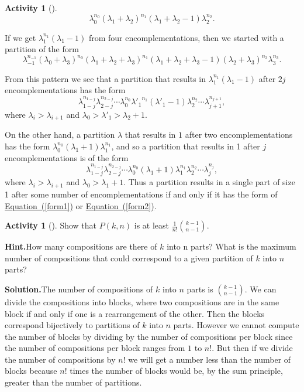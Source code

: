 \documentclass[10pt,]{book}
\theoremstyle{plain}
\theoremstyle{definition}
\newtheorem{activity}[project]{Activity}
\numberwithin{equation}{chapter}
\begin{document}
\begin{activity}[]
\begin{equation*}
\lambda_0^{n_0}(\lambda_1+\lambda_{2})^{n_1}(\lambda_1+
\lambda_2-1)\lambda_2^{n_2}.
\end{equation*}
%
\par
If we get \(\lambda_1^{n_1}(\lambda_1-1)\) from four encomplementations, then we started with a partition of the form%
\begin{equation*}
\lambda_{-1}^{n_{-1}}(\lambda_0+\lambda_{3})^{n_0}(\lambda_1+
\lambda_2 +
\lambda_{3})^{n_1}(\lambda_1+\lambda_2 +\lambda_3-1)(\lambda_2+
\lambda_{3})^{n_3}
\lambda_3^{n_3}.
\end{equation*}
%
\par
From this pattern we see that a partition that results in \(\lambda_1^{n_1}(\lambda_1-1)\) after \(2j\) encomplementations has the form%
\begin{equation}
\lambda_{1-j}^{n_{1-j}}\lambda_{2-j}^{n_{2-j}}\cdots
\lambda_0^{n_0}
{\lambda'_1}^{n_1}
(\lambda'_1-1)\lambda_2^{n_2}\cdots
\lambda_{j+1}^{n_{j+1}},\label{form1}
\end{equation}
where \(\lambda_i>\lambda_{i+1}\) and \(\lambda_0>\lambda'_1>\lambda_2+1\).%
\par
On the other hand, a partition \(\lambda\) that results in \(1\) after two encomplementations has the form \(\lambda_0^{n_0}(\lambda_1+1)\lambda_1^{n_1}\), and so a partition that results in 1 after \(j\) encomplementations is of the form%
\begin{equation}
\lambda_{1-j}^{n_{1-j}}\lambda_{2-j}^{n_{2-j}}\cdots
\lambda_0^{n_0}(\lambda_1+1)\lambda_1^{n_1}\lambda_2^{n_2}\cdots
\lambda_j^{n_j},\label{form2}
\end{equation}
where \(\lambda_i>\lambda_{i+1}\) and \(\lambda_0>\lambda_1+1\). Thus a partition results in a single part of size 1 after some number of encomplementations if and only if it has the form of \hyperref[form1]{Equation~(\ref{form1})} or \hyperref[form2]{Equation~(\ref{form2})}.%
\end{activity}
\begin{activity}[]\label{activity-158}
Show that \(P(k,n)\) is at least \(\frac{1}{n!}\binom{k-1}{n-1}\).%
\par\medskip\noindent%
\textbf{Hint.}\quad How many compositions are there of \(k\) into n parts? What is the maximum number of compositions that could correspond to a given partition of \(k\) into \(n\) parts?%
\par\medskip\noindent%
\textbf{Solution.}\quad The number of compositions of \(k\) into \(n\) parts is \(\binom{k-1}{n-1}\). We can divide the compositions into blocks, where two compositions are in the same block if and only if one is a rearrangement of the other. Then the blocks correspond bijectively to partitions of \(k\) into \(n\) parts. However we cannot compute the number of blocks by dividing by the number of compositions per block since the number of compositions per block ranges from \(1\) to \(n!\).  But then if we divide the number of compositions by \(n!\) we will get a number less than the number of blocks because \(n!\) times the number of blocks would be, by the sum principle, greater than the number of partitions.%
\end{activity}
\end{document}
